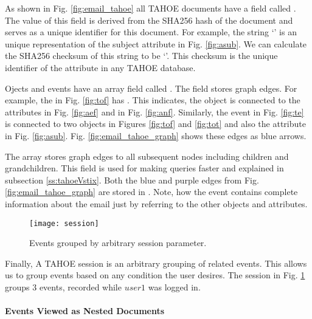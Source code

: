 As shown in Fig. \ref{fig:email_tahoe} all TAHOE documents have a field called . The value of this field is derived from the SHA256 hash of the document and serves as a unique identifier for this document. For example, the string `' is an unique representation of the subject attribute in Fig. \ref{fig:asub}. We can calculate the SHA256 checksum of this string to be `'. This checksum is the unique identifier of the attribute  in any TAHOE database.

Ojects and events have an array field called . The  field stores graph edges. For example, the  in Fig. \ref{fig:tof} has . This indicates, the object is connected to the attributes in Fig. \ref{fig:aef} and in Fig. \ref{fig:anf}. Similarly, the event in Fig. \ref{fig:te} is connected to two objects in Figures \ref{fig:tof} and \ref{fig:tot} and also the attribute in Fig. \ref{fig:asub}. Fig. \ref{fig:email_tahoe_graph} shows these edges as blue arrows.

The array  stores graph edges to all subsequent nodes including children and grandchildren. This field is used for making queries faster and explained in subsection \ref{ss:tahoeVstix}. Both the blue and purple edges from Fig. \ref{fig:email_tahoe_graph} are stored in . Note, how the event contains complete information about the email just by referring to the other objects and attributes.



\begin{figure}[!ht]
	\texttt{[image: session]} %
	\centering
	\caption{Events grouped by arbitrary session parameter.}
	\label{fig:session}
\end{figure}

Finally, A TAHOE session is an arbitrary grouping of related events. This allows us to group events based on any condition the user desires. The session in Fig. \ref{fig:session} groups $3$ events, recorded while $user1$ was logged in.



\paragraph{\textbf{Events Viewed as Nested Documents}}

